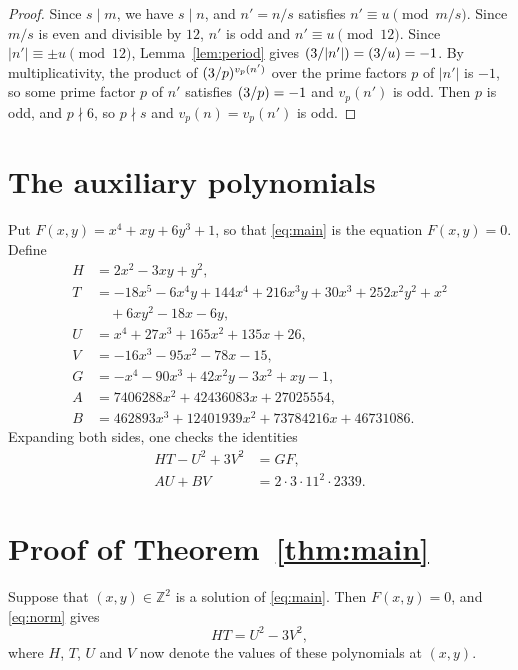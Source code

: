 \documentclass[11pt]{article}
\newcommand{\Z}{\mathbb{Z}}
\newcommand{\leg}[2]{\mathchoice{\biggl(\dfrac{#1}{#2}\biggr)}{(#1/#2)}{(#1/#2)}{(#1/#2)}}
\begin{document}
\begin{proof}
Since $s\mid m$, we have $s\mid n$, and $n'=n/s$ satisfies $n'\equiv u\pmod{m/s}$. Since $m/s$ is even and divisible by $12$, $n'$ is odd and $n'\equiv u\pmod{12}$. Since $|n'|\equiv\pm u\pmod{12}$, Lemma~\ref{lem:period} gives $\leg{3}{|n'|}=\leg{3}{u}=-1$. By multiplicativity, the product of $\leg{3}{p}^{v_p(n')}$ over the prime factors $p$ of $|n'|$ is $-1$, so some prime factor $p$ of $n'$ satisfies $\leg{3}{p}=-1$ and $v_p(n')$ is odd. Then $p$ is odd, and $p\nmid6$, so $p\nmid s$ and $v_p(n)=v_p(n')$ is odd.
\end{proof}

\section{The auxiliary polynomials}

Put $F(x,y)=x^{4}+xy+6y^{3}+1$, so that \eqref{eq:main} is the equation $F(x,y)=0$. Define
\begin{align*}
H&=2x^{2}-3xy+y^{2},\\
T&=-18x^{5}-6x^{4}y+144x^{4}+216x^{3}y+30x^{3}+252x^{2}y^{2}+x^{2}\\
&\quad+6xy^{2}-18x-6y,\\
U&=x^{4}+27x^{3}+165x^{2}+135x+26,\\
V&=-16x^{3}-95x^{2}-78x-15,\\
G&=-x^{4}-90x^{3}+42x^{2}y-3x^{2}+xy-1,\\
A&=7406288x^{2}+42436083x+27025554,\\
B&=462893x^{3}+12401939x^{2}+73784216x+46731086.
\end{align*}
Expanding both sides, one checks the identities
\begin{align}
HT-U^2+3V^2&=GF,\label{eq:norm}\\
AU+BV&=2\cdot 3\cdot 11^{2}\cdot 2339.\label{eq:bezout}
\end{align}

\section{Proof of Theorem~\ref{thm:main}}

Suppose that $(x,y)\in\Z^2$ is a solution of \eqref{eq:main}. Then $F(x,y)=0$, and \eqref{eq:norm} gives
\begin{equation}\label{eq:HT}
HT=U^2-3V^2,
\end{equation}
where $H$, $T$, $U$ and $V$ now denote the values of these polynomials at $(x,y)$.
\end{document}
